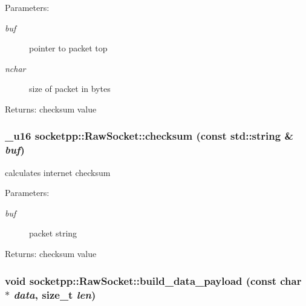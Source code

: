 \begin{Desc}
\item[Parameters:]
\begin{description}
\item[{\em buf}]pointer to packet top \item[{\em nchar}]size of packet in bytes \end{description}
\end{Desc}
\begin{Desc}
\item[Returns:]checksum value \end{Desc}
\hypertarget{classsocketpp_1_1RawSocket_67af2c9f3bc37146b54fc9fb69c0dd8d}{
\subsubsection{\setlength{\rightskip}{0pt plus 5cm}\_\-u16 socketpp::RawSocket::checksum (const std::string \& {\em buf})}}
\label{classsocketpp_1_1RawSocket_67af2c9f3bc37146b54fc9fb69c0dd8d}


calculates internet checksum 

\begin{Desc}
\item[Parameters:]
\begin{description}
\item[{\em buf}]packet string \end{description}
\end{Desc}
\begin{Desc}
\item[Returns:]checksum value \end{Desc}
\hypertarget{classsocketpp_1_1RawSocket_99ea2415525269d24ba088a58d62abdd}{
\subsubsection{\setlength{\rightskip}{0pt plus 5cm}void socketpp::RawSocket::build\_\-data\_\-payload (const char $\ast$ {\em data}, \/  size\_\-t {\em len})}}
\label{classsocketpp_1_1RawSocket_99ea2415525269d24ba088a58d62abdd}


